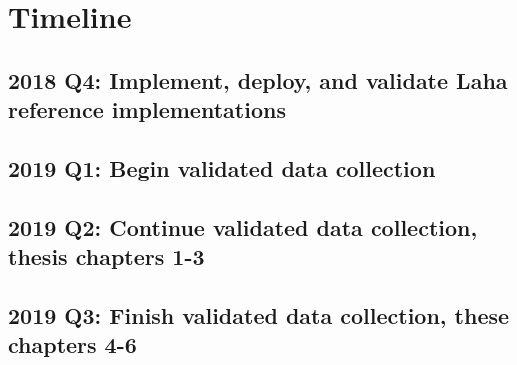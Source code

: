 \section{Timeline}
\subsection{2018 Q4: Implement, deploy, and validate Laha reference implementations}
\subsection{2019 Q1: Begin validated data collection}
\subsection{2019 Q2: Continue validated data collection, thesis chapters 1-3}
\subsection{2019 Q3: Finish validated data collection, these chapters 4-6}





